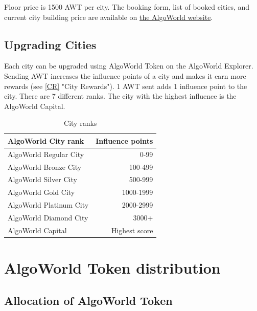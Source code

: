 \documentclass{article}
\begin{document}
Floor price is 1500 AWT per city.
The booking form, list of booked cities, and current city building price are available on \href{https://www.algoworld.io/city-booking}{the AlgoWorld website}.


\subsection{Upgrading Cities}
\label{ssec:upgrading-cities}

Each city can be upgraded using AlgoWorld Token on the AlgoWorld Explorer.
Sending AWT increases the influence points of a city and makes it earn more rewards (see \ref{CR} "City Rewards").
1 AWT sent adds 1 influence point to the city.
There are 7 different ranks. The city with the highest influence is the AlgoWorld Capital.

\begin{table}[ht]
\centering
\begin{tabular}{l|r}
AlgoWorld City rank & Influence points \\\hline
AlgoWorld Regular City & 0-99 \\
AlgoWorld Bronze City & 100-499 \\
AlgoWorld Silver City & 500-999 \\
AlgoWorld Gold City & 1000-1999 \\
AlgoWorld Platinum City & 2000-2999 \\
AlgoWorld Diamond City & 3000+ \\
AlgoWorld Capital & Highest score \\
\end{tabular}
\caption{\label{tab:widgets}City ranks}
\end{table}

\newpage

\section{AlgoWorld Token distribution}
\label{sec:algoworld-token-distribution}

\subsection{Allocation of AlgoWorld Token}
\label{ssec:allocation-of-algoworld-token}
\end{document}
